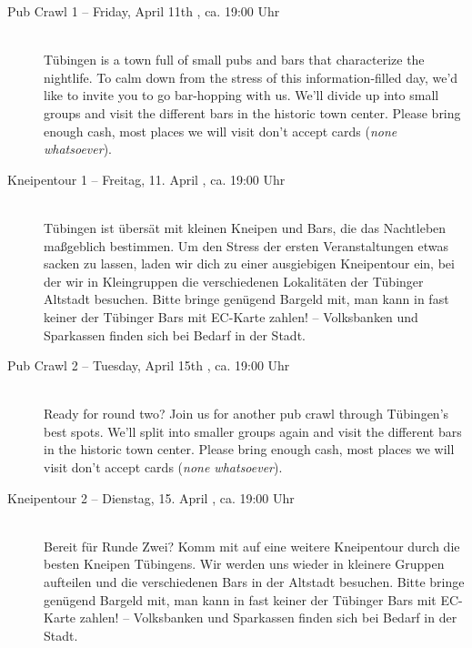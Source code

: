 \begin{description}
\ifmaster \iflehramt \pagebreak \fi \fi
\ifmaster \ifkogwiss \pagebreak \fi \fi

\ifml
    \item[Pub Crawl 1 -- Friday, April 11th \YEAR, ca. 19:00 Uhr]~\\
    Tübingen is a town full of small pubs and bars that characterize the nightlife.
    To calm down from the stress of this information-filled day, we'd like to invite you to go bar-hopping with us.
    We'll divide up into small groups and visit the different bars in the historic town center.
    Please bring enough cash, most places we will visit don't accept cards (\emph{none whatsoever}). 
\else
    \item[Kneipentour 1 -- Freitag, 11. April \YEAR, ca. 19:00 Uhr]~\\
    Tübingen ist übersät mit kleinen Kneipen und Bars, die das Nachtleben maßgeblich bestimmen.
    Um den Stress der ersten Veranstaltungen etwas sacken zu lassen, laden wir dich zu einer ausgiebigen Kneipentour ein,
    bei der wir in Kleingruppen die verschiedenen Lokalitäten der Tübinger Altstadt besuchen.
    Bitte bringe genügend Bargeld mit, man kann in fast keiner der Tübinger Bars mit EC-Karte zahlen! -- Volksbanken und Sparkassen finden sich bei Bedarf in der Stadt.
\fi

\ifml
\item[Pub Crawl 2  -- Tuesday, April 15th \YEAR, ca. 19:00 Uhr]~\\
    Ready for round two? Join us for another pub crawl through Tübingen's best spots.
    We'll split into smaller groups again and visit the different bars in the historic town center.
    Please bring enough cash, most places we will visit don't accept cards (\emph{none whatsoever}).
\else
\item[Kneipentour 2  -- Dienstag, 15. April \YEAR, ca. 19:00 Uhr]~\\
    Bereit für Runde Zwei? Komm mit auf eine weitere Kneipentour durch die besten Kneipen Tübingens.
    Wir werden uns wieder in kleinere Gruppen aufteilen und die verschiedenen Bars in der Altstadt besuchen.
    Bitte bringe genügend Bargeld mit, man kann in fast keiner der Tübinger Bars mit EC-Karte zahlen! -- Volksbanken und Sparkassen finden sich bei Bedarf in der Stadt.
\fi


\end{description}
